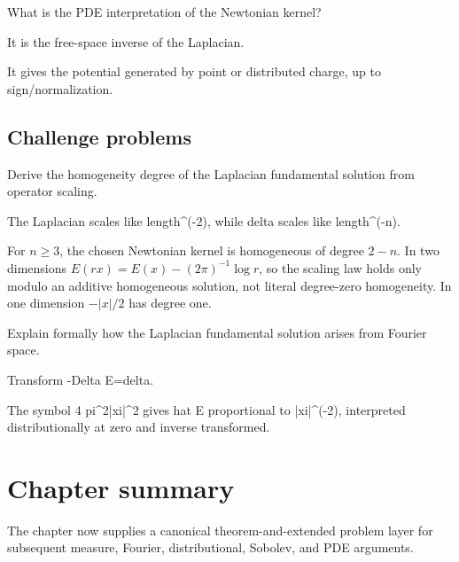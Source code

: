 \begin{exercise}[Electrostatics]\label{exr:iii24-expand-14}
What is the PDE interpretation of the Newtonian kernel?
\end{exercise}
\begin{hint}
It is the free-space inverse of the Laplacian.
\end{hint}
\begin{solution}
It gives the potential generated by point or distributed charge, up to sign/normalization.
\end{solution}

\subsection*{Challenge problems}

\begin{exercise}[Scaling]\label{exr:iii24-expand-15}
Derive the homogeneity degree of the Laplacian fundamental solution from operator scaling.
\end{exercise}
\begin{hint}
The Laplacian scales like length\textasciicircum{}(-2), while delta scales like length\textasciicircum{}(-n).
\end{hint}
\begin{solution}
For $n\ge3$, the chosen Newtonian kernel is homogeneous of degree $2-n$. In two dimensions $E(rx)=E(x)-(2\pi)^{-1}\log r$, so the scaling law holds only modulo an additive homogeneous solution, not literal degree-zero homogeneity. In one dimension $-|x|/2$ has degree one.
\end{solution}

\begin{exercise}\label{exr:iii24-expand-16}
Explain formally how the Laplacian fundamental solution arises from Fourier space.
\end{exercise}
\begin{hint}
Transform -Delta E=delta.
\end{hint}
\begin{solution}
The symbol 4 pi\textasciicircum{}2|xi|\textasciicircum{}2 gives hat E proportional to |xi|\textasciicircum{}(-2), interpreted distributionally at zero and inverse transformed.
\end{solution}
\section*{Chapter summary}
The chapter now supplies a canonical theorem-and-extended problem layer for subsequent measure, Fourier, distributional, Sobolev, and PDE arguments.

